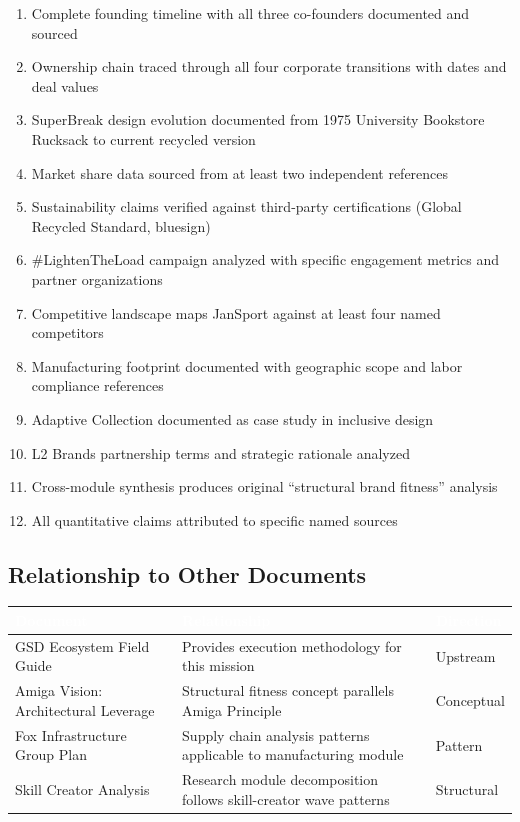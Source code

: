 \documentclass[11pt,letterpaper]{article}
\newcommand{\tableheader}[1]{\textbf{\sffamily\textcolor{white}{#1}}}
\begin{document}
\begin{enumerate}[label=\textbf{\arabic*.}]
  \item Complete founding timeline with all three co-founders documented and sourced
  \item Ownership chain traced through all four corporate transitions with dates and deal values
  \item SuperBreak design evolution documented from 1975 University Bookstore Rucksack to current recycled version
  \item Market share data sourced from at least two independent references
  \item Sustainability claims verified against third-party certifications (Global Recycled Standard, bluesign)
  \item \#LightenTheLoad campaign analyzed with specific engagement metrics and partner organizations
  \item Competitive landscape maps JanSport against at least four named competitors
  \item Manufacturing footprint documented with geographic scope and labor compliance references
  \item Adaptive Collection documented as case study in inclusive design
  \item L2 Brands partnership terms and strategic rationale analyzed
  \item Cross-module synthesis produces original ``structural brand fitness'' analysis
  \item All quantitative claims attributed to specific named sources
\end{enumerate}

\subsection{Relationship to Other Documents}

\begin{center}
\begin{tabularx}{\textwidth}{L{4cm}XC{2.5cm}}
\toprule
{}
\tableheader{Document} & \tableheader{Relationship} & \tableheader{Direction} \\
\midrule
GSD Ecosystem Field Guide & Provides execution methodology for this mission & Upstream \\
Amiga Vision: Architectural Leverage & Structural fitness concept parallels Amiga Principle & Conceptual \\
Fox Infrastructure Group Plan & Supply chain analysis patterns applicable to manufacturing module & Pattern \\
Skill Creator Analysis & Research module decomposition follows skill-creator wave patterns & Structural \\
\bottomrule
\end{tabularx}
\end{center}
\end{document}

